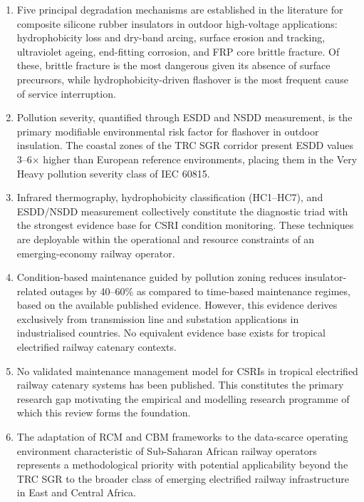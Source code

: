 \documentclass[preprint,12pt,3p]{elsarticle}
\begin{document}
\begin{enumerate}

  \item Five principal degradation mechanisms are established in the
    literature for composite silicone rubber insulators in outdoor
    high-voltage applications: hydrophobicity loss and dry-band
    arcing, surface erosion and tracking, ultraviolet ageing,
    end-fitting corrosion, and FRP core brittle fracture. Of these,
    brittle fracture is the most dangerous given its absence of
    surface precursors, while hydrophobicity-driven flashover is
    the most frequent cause of service interruption.

  \item Pollution severity, quantified through ESDD and NSDD
    measurement, is the primary modifiable environmental risk
    factor for flashover in outdoor insulation. The coastal zones of
    the TRC SGR corridor present ESDD values 3--6$\times$ higher
    than European reference environments, placing them in the Very
    Heavy pollution severity class of IEC 60815.

  \item Infrared thermography, hydrophobicity classification (HC1--HC7),
    and ESDD/NSDD measurement collectively constitute the diagnostic
    triad with the strongest evidence base for CSRI condition monitoring.
    These techniques are deployable within the operational and resource
    constraints of an emerging-economy railway operator.

  \item Condition-based maintenance guided by pollution zoning reduces
    insulator-related outages by 40--60\% as compared to time-based
    maintenance regimes, based on the available published evidence.
    However, this evidence derives exclusively from transmission line
    and substation applications in industrialised countries. No
    equivalent evidence base exists for tropical electrified railway
    catenary contexts.

  \item No validated maintenance management model for CSRIs in tropical
    electrified railway catenary systems has been published. This
    constitutes the primary research gap motivating the empirical
    and modelling research programme of which this review forms the
    foundation.

  \item The adaptation of RCM and CBM frameworks to the data-scarce
    operating environment characteristic of Sub-Saharan African railway
    operators represents a methodological priority with potential
    applicability beyond the TRC SGR to the broader class of emerging
    electrified railway infrastructure in East and Central Africa.

\end{enumerate}
\end{document}
